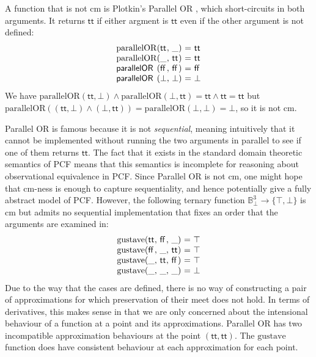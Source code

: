 \begin{example}
\end{example}

\begin{example}
  \label{ex:parallel-or}
  A function that is not cm is Plotkin's Parallel OR \cite{lcf77}, which short-circuits in both arguments. It returns $\mathsf{tt}$ if either argment is $\mathsf{tt}$ even if the other argument is not defined:
  \begin{displaymath}
    \begin{array}{l@{(}l@{,~}l@{)~}c@{~}l}
      \mathrm{parallelOR}&\mathsf{tt}&\_&=&\mathsf{tt} \\
      \mathrm{parallelOR}&\_&\mathsf{tt}&=&\mathsf{tt} \\
      \mathsf{parallelOR}&\mathsf{ff}&\mathsf{ff}&=&\mathsf{ff} \\
      \mathsf{parallelOR}&\bot&\bot&=&\bot
    \end{array}
  \end{displaymath}
  We have $\mathrm{parallelOR}(\mathsf{tt}, \bot) \wedge \mathrm{parallelOR}(\bot, \mathsf{tt}) = \mathsf{tt} \wedge \mathsf{tt} = \mathsf{tt}$ but $\mathrm{parallelOR}((\mathsf{tt},\bot) \wedge (\bot, \mathsf{tt})) = \mathrm{parallelOR}(\bot, \bot) = \bot$, so it is not cm.

  Parallel OR is famous because it is not \emph{sequential}, meaning intuitively that it cannot be implemented without running the two arguments in parallel to see if one of them returns $\mathsf{tt}$. The fact that it exists in the standard domain theoretic semantics of PCF means that this semantics is incomplete for reasoning about observational equivalence in PCF. Since Parallel OR is not cm, one might hope that cm-ness is enough to capture sequentiality, and hence potentially give a fully abstract model of PCF. However, the following ternary function $\mathbb{B}_\bot^3 \to \{\top,\bot\}$ is cm but admits no sequential implementation that fixes an order that the arguments are examined in:
  \begin{displaymath}
    \begin{array}{l@{(}l@{,~}l@{,~}l@{)~}c@{~}l}
      \mathrm{gustave}&\mathsf{tt}&\mathsf{ff}&\_&=&\top \\
      \mathrm{gustave}&\mathsf{ff}&\_&\mathsf{tt}&=&\top \\
      \mathrm{gustave}&\_&\mathsf{tt}&\mathsf{ff}&=&\top \\
      \mathrm{gustave}&\_&\_&\_&=&\bot
    \end{array}
  \end{displaymath}
  Due to the way that the cases are defined, there is no way of constructing a pair of approximations for which preservation of their meet does not hold. In terms of derivatives, this makes sense in that we are only concerned about the intensional behaviour of a function at a point and its approximations. Parallel OR has two incompatible approximation behaviours at the point $(\mathsf{tt},\mathsf{tt})$. The $\mathrm{gustave}$ function does have consistent behaviour at each approximation for each point.


\end{example}
